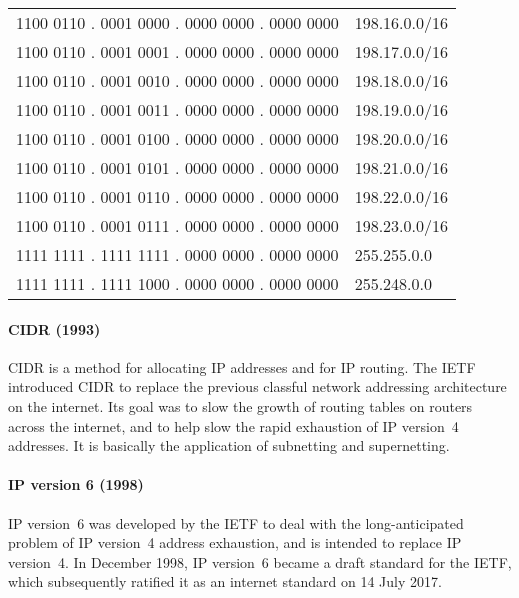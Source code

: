 \begin{center}
\tosfstyle
\begin{tabular}{@{}ll@{}}
\textcolor{spot1}{1100 0110 . 0001 0}\textcolor{spot2}{000} . 0000 0000 . 0000 0000 & 198.16.0.0/16 \\
\textcolor{spot1}{1100 0110 . 0001 0}\textcolor{spot2}{001} . 0000 0000 . 0000 0000 & 198.17.0.0/16 \\
\textcolor{spot1}{1100 0110 . 0001 0}\textcolor{spot2}{010} . 0000 0000 . 0000 0000 & 198.18.0.0/16 \\
\textcolor{spot1}{1100 0110 . 0001 0}\textcolor{spot2}{011} . 0000 0000 . 0000 0000 & 198.19.0.0/16 \\
\textcolor{spot1}{1100 0110 . 0001 0}\textcolor{spot2}{100} . 0000 0000 . 0000 0000 & 198.20.0.0/16 \\
\textcolor{spot1}{1100 0110 . 0001 0}\textcolor{spot2}{101} . 0000 0000 . 0000 0000 & 198.21.0.0/16 \\
\textcolor{spot1}{1100 0110 . 0001 0}\textcolor{spot2}{110} . 0000 0000 . 0000 0000 & 198.22.0.0/16 \\
\textcolor{spot1}{1100 0110 . 0001 0}\textcolor{spot2}{111} . 0000 0000 . 0000 0000 & 198.23.0.0/16 \\
\hline
1111 1111 . 1111 1111 . 0000 0000 . 0000 0000 & 255.255.0.0 \\
1111 1111 . 1111 1000 . 0000 0000 . 0000 0000 & 255.248.0.0 \\
\end{tabular}
\end{center}

\paragraph{\acf{CIDR} (1993)}
\Acl{CIDR} is a method for allocating \acs{IP} addresses and for \acs{IP} routing.
The \gls{IETF} introduced \acs{CIDR} to replace the previous classful network addressing architecture on the internet.
Its goal was to slow the growth of routing tables on routers across the internet, and to help slow the rapid exhaustion of \acs{IP} version~4 addresses.
It is basically the application of subnetting and supernetting.

\paragraph{\acs{IP} version 6 (1998)}
\acs{IP} version~6 was developed by the \gls{IETF} to deal with the long-anticipated problem of \acs{IP} version~4 address exhaustion, and is intended to replace \acs{IP} version~4.
In December 1998, \acs{IP} version~6 became a draft standard for the \gls{IETF}, which subsequently ratified it as an internet standard on 14 July 2017.

